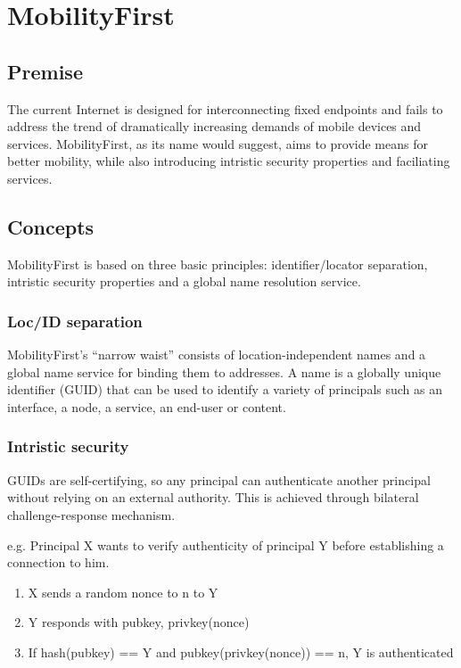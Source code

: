     \section{MobilityFirst}
        \subsection{Premise}
            The current Internet is designed for interconnecting fixed endpoints and fails to address the trend of dramatically increasing demands of mobile devices and services. MobilityFirst, as its name would suggest, aims to provide means for better mobility, while also introducing intristic security properties and faciliating services.

        \subsection{Concepts}

            MobilityFirst is based on three basic principles: identifier/locator separation, intristic security properties and a global name resolution service.

            \subsubsection{Loc/ID separation}

            MobilityFirst's ``narrow waist'' consists of location-independent names and a global name service for binding them to addresses. A name is a globally unique identifier (GUID) that can be used to identify a variety of principals such as an interface, a node, a service, an end-user or content.


            \subsubsection{Intristic security}

            GUIDs are self-certifying, so any principal can authenticate another principal without relying on an external authority. This is achieved through bilateral challenge-response mechanism.

            e.g. Principal X wants to verify authenticity of principal Y before establishing a connection to him.
            \begin{enumerate}
                \item X sends a random nonce to n to Y
                \item Y responds with {pubkey, privkey(nonce)}
                \item If hash(pubkey) == Y and pubkey(privkey(nonce)) == n, Y is authenticated
            \end{enumerate}

